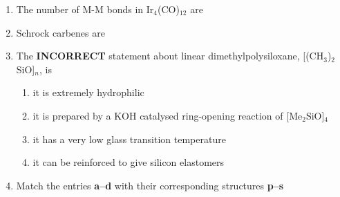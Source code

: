 \documentclass[12pt]{article}
\begin{document}
\begin{enumerate}
\item The number of M-M bonds in Ir$_4$(CO)$_{12}$ are
\begin{enumerate}
   \hfill{}
\end{enumerate}

\item Schrock carbenes are
\begin{enumerate}
\hfill{}
\end{enumerate}


\item The \textbf{INCORRECT} statement about linear dimethylpolysiloxane, [(CH$_3$)$_2$SiO]$_n$, is
\begin{enumerate}
\item it is extremely hydrophilic
\item it is prepared by a KOH catalysed ring-opening reaction of [Me$_2$SiO]$_4$
\item it has a very low glass transition temperature
\item it can be reinforced to give silicon elastomers    \hfill{}

\end{enumerate}




\item Match the entries \textbf{a–d} with their corresponding structures \textbf{p–s}


\end{enumerate}
\end{document}
